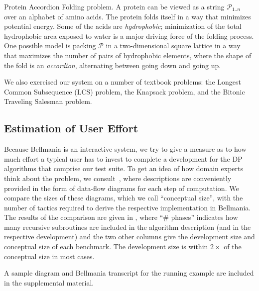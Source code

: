 \begin{paragraph}{Protein Accordion Folding problem.} A protein can be viewed
as a string $\mathcal{P}_{1..n}$ over an alphabet of amino acids. 
The protein folds itself in a way that minimizes potential energy.
Some of the acids are {\em hydrophobic}; minimization of the total hydrophobic
area exposed to water is a major driving force of the folding process.
One possible model is packing $\mathcal{P}$ in a two-dimensional square lattice
in a way that maximizes the number of pairs of hydrophobic elements,
where the shape of the fold is an {\em accordion}, alternating between going down and going
up.
\end{paragraph}

\medskip
We also exercised our system on a number of textbook problems:
the Longest Common Subsequence (LCS) problem, the Knapsack problem,
and the Bitonic Traveling Salesman problem.

\subsection{Estimation of User Effort}
\label{evaluation:effort}

Because Bellmania is an interactive system, we try to give a measure as to how much effort a typical user has to invest
to complete a development for the DP algorithms that comprise our test suite.
To get an idea of how domain experts think about the problem, we consult~\cite{PPoPP16/Chowdhury},
where descriptions are conveniently provided in the form of data-flow diagrams for each step of computation.
We compare the sizes of these diagrams, which we call ``conceptual size'', with the number of tactics
required to derive the respective implementation in Bellmania.
The results of the comparison are given in , where ``\# phases''
indicates how many recursive subroutines are included in the algorithm description 
(and in the respective development) and the two other columns give the development size and conceptual size
of each benchmark.
The development size is within $2\times$ of the conceptual size in most cases.

A sample diagram and Bellmania transcript for the running example are included in the supplemental material.

